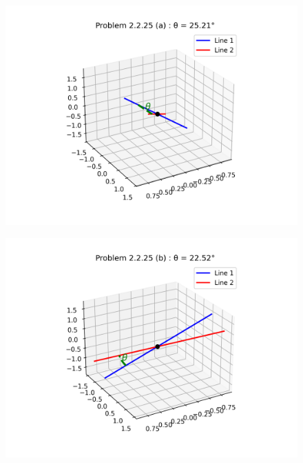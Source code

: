 \documentclass[12pt]{article}
\begin{document}
\newpage

\begin{multicols}{2}
\begin{figure}[H]
    \centering
    \includegraphics[width=1\columnwidth]{figs/figure_a.png}
    \caption{}
    \label{fig:placeholder}
\end{figure}

\begin{figure}[H]
    \centering
    \includegraphics[width=1\columnwidth]{figs/figure_b.png}
    \caption{}
    \label{fig:placeholder}
\end{figure}


\end{multicols}
\end{document}
